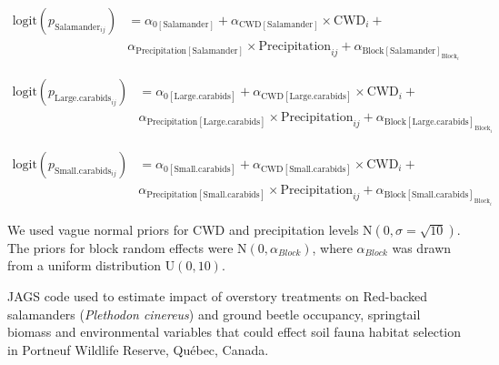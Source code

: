 \begin{align}
  \text{logit}(p_{\text{Salamander}_{ij}}) &= \alpha_{0[\text{Salamander}]} + \alpha_{\text{CWD}[\text{Salamander}]} \times \text{CWD}_i + \nonumber \\
  &\alpha_{\text{Precipitation}[\text{Salamander}]} \times \text{Precipitation}_{ij} + \alpha_{\text{Block}[\text{Salamander}]_{\text{Block}_i}} \nonumber
\end{align}

\begin{align}
  \text{logit}(p_{\text{Large.carabids}_{ij}}) &= \alpha_{0[\text{Large.carabids}]} + \alpha_{\text{CWD}[\text{Large.carabids}]} \times \text{CWD}_i + \\
  &\alpha_{\text{Precipitation}[\text{Large.carabids}]} \times \text{Precipitation}_{ij} + \alpha_{\text{Block}[\text{Large.carabids}]_{\text{Block}_i}} \nonumber 
\end{align}

\begin{align}
  \text{logit}(p_{\text{Small.carabids}_{ij}}) &= \alpha_{0[\text{Small.carabids}]} + \alpha_{\text{CWD}[\text{Small.carabids}]} \times \text{CWD}_i + \nonumber \\
  &\alpha_{\text{Precipitation}[\text{Small.carabids}]} \times \text{Precipitation}_{ij} + \alpha_{\text{Block}[\text{Small.carabids}]_{\text{Block}_i}} \nonumber 
\end{align}


We used vague normal priors for CWD and precipitation levels $\text{N}(0, \sigma = \sqrt{10})$. 
The priors for block random effects were $\text{N}(0, \alpha_{Block})$, where $\alpha_{Block}$ was drawn from a uniform distribution $\text{U}(0, 10)$. 

\clearpage


\begin{table}[ht]
\caption[JAGS code used to estimate impact of overstory treatments on Red-backed salamanders (\textit{Plethodon cinereus}) and ground beetle occupancy, springtail biomass and environmental variables that could effect soil fauna habitat selection.]
    {JAGS code used to estimate impact of overstory treatments on Red-backed salamanders (\textit{Plethodon cinereus}) and ground beetle occupancy, springtail biomass and environmental variables that could effect soil fauna habitat selection in Portneuf Wildlife Reserve, Québec, Canada.}
    \label{ann:SEM_script}
\end{table}

